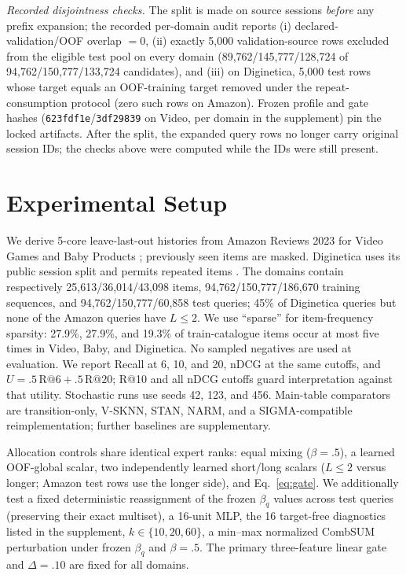 \documentclass[runningheads]{llncs}
\begin{document}
\noindent\emph{Recorded disjointness checks.} The split is made on source
sessions \emph{before} any prefix expansion; the recorded per-domain audit
reports (i) declared-validation/OOF overlap $=0$, (ii) exactly 5,000
validation-source rows excluded from the eligible test pool on every domain
(89,762/145,777/128,724 of 94,762/150,777/133,724 candidates), and (iii) on
Diginetica, 5,000 test rows whose target equals an OOF-training target
removed under the repeat-consumption protocol (zero such rows on Amazon).
Frozen profile and gate hashes (\texttt{623fdf1e}/\texttt{3df29839} on Video,
per domain in the supplement) pin the locked artifacts. After the split, the
expanded query rows no longer carry original session IDs; the checks above
were computed while the IDs were still present.

\section{Experimental Setup}
We derive 5-core leave-last-out histories from Amazon Reviews 2023 for Video
Games and Baby Products \cite{hou2024amazonreviews}; previously seen items are
masked. Diginetica uses its public session split and permits repeated items
\cite{diginetica2016}.
The domains contain respectively 25,613/36,014/43,098 items,
94,762/150,777/186,670 training sequences, and
94,762/150,777/60,858 test queries; 45\% of Diginetica queries but none of
the Amazon queries have $L\leq2$. We use ``sparse'' for item-frequency
sparsity: 27.9\%, 27.9\%, and 19.3\% of train-catalogue items occur at most
five times in Video, Baby, and Diginetica.
No sampled negatives are used at evaluation. We report Recall at 6, 10, and
20, nDCG at the same cutoffs, and
$U=.5\,\mathrm{R@6}+.5\,\mathrm{R@20}$; R@10 and all nDCG cutoffs guard
interpretation against that utility. Stochastic runs use seeds 42, 123, and
456. Main-table comparators are transition-only, V-SKNN, STAN, NARM, and a
SIGMA-compatible reimplementation; further baselines are
supplementary.

Allocation controls share identical expert ranks: equal mixing
($\beta=.5$), a learned OOF-global scalar, two independently learned
short/long scalars ($L\leq2$ versus longer; Amazon test rows use the longer
side), and Eq.~\ref{eq:gate}. We additionally test a
fixed deterministic reassignment of the frozen $\beta_q$ values across test
queries (preserving their exact multiset), a 16-unit MLP, the 16 target-free
diagnostics listed in the supplement, $k\in\{10,20,60\}$,
a min--max normalized CombSUM perturbation under frozen $\beta_q$ and
$\beta=.5$. The primary three-feature linear gate and $\Delta=.10$ are
fixed for all domains.
\end{document}
